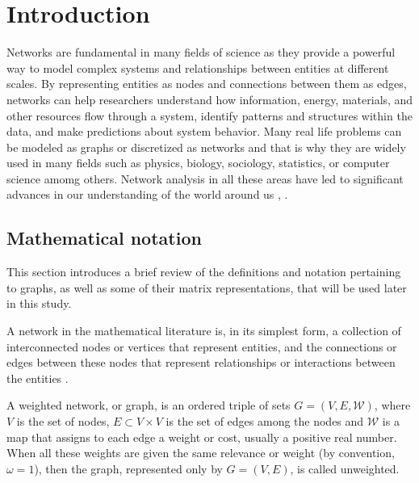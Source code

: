 
\chapter[Introduction]{Introduction}
\label{chap:intro}

Networks are fundamental in many fields of science as they provide a powerful way to model complex systems and relationships between entities at different scales. By representing entities as nodes and connections between them as edges, networks can help researchers understand how information, energy, materials, and other resources flow through a system, identify patterns and structures within the data, and make predictions about system behavior. Many real life problems can be modeled as graphs or discretized as networks and that is why they are widely used in many fields such as physics, biology, sociology, statistics, or computer science amomg others. Network analysis in all these areas have led to significant advances in our understanding of the world around us \cite{albert2002statistical, katz1953new}, \cite[Part I]{newman2018networks}.

\section{Mathematical notation}
\label{sec:graph}
This section introduces a brief review of the definitions and notation pertaining to graphs, as well as some of their matrix representations, that will be used later in this study.

A network in the mathematical literature is, in its simplest form, a collection of interconnected nodes or vertices that represent entities, and the connections or edges between these nodes that represent relationships or interactions between the entities \cite{arrigo2022dynamic}.

\begin{definition}
    A weighted network, or graph, is an ordered triple of sets $G = (V, E, \mathcal{W})$, where $V$ is the set of nodes, $E\subset V\times V$ is the set of edges among the nodes and $\mathcal{W}$ is a map that assigns to each edge a weight or cost, usually a positive real number. When all these weights are given the same relevance or weight (by convention, $\omega=1$), then the graph, represented only by $G = (V, E)$, is called unweighted.
\end{definition}


